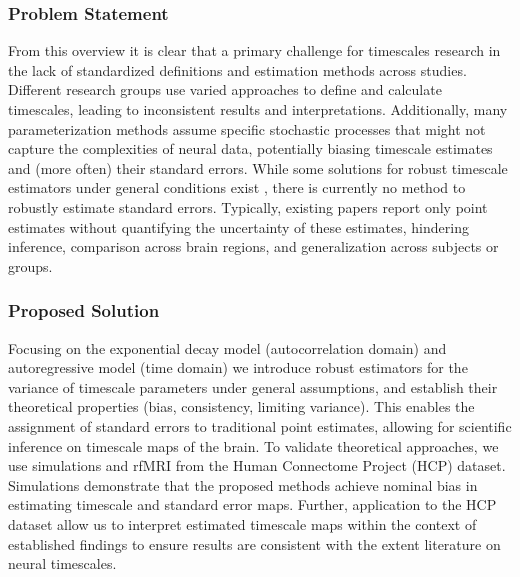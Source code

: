 \documentclass[latex/main.tex]{subfiles}
\begin{document}
\subsubsection*{Problem Statement}
From this overview it is clear that a primary challenge for timescales research in the lack of standardized definitions and estimation methods across studies. Different research groups use varied approaches to define and calculate timescales, leading to inconsistent results and interpretations. Additionally, many parameterization methods assume specific stochastic processes that might not capture the complexities of neural data, potentially biasing timescale estimates and (more often) their standard errors. While some solutions for robust timescale estimators under general conditions exist \cite{zeraati_flexible_2022, donoghue_parameterizing_2020, gao_neuronal_2020}, there is currently no method to robustly estimate standard errors. Typically, existing papers report only point estimates without quantifying the uncertainty of these estimates, hindering inference, comparison across brain regions, and generalization across subjects or groups.\\

\subsubsection*{Proposed Solution}
Focusing on the exponential decay model (autocorrelation domain) and autoregressive model (time domain) we introduce robust estimators for the variance of timescale parameters under general assumptions, and establish their theoretical properties (bias, consistency, limiting variance). This enables the assignment of standard errors to traditional point estimates, allowing for scientific inference on timescale maps of the brain. To validate theoretical approaches, we use simulations and rfMRI from the Human Connectome Project (HCP) dataset. Simulations demonstrate that the proposed methods achieve nominal bias in estimating timescale and standard error maps. Further, application to the HCP dataset allow us to interpret estimated timescale maps within the context of established findings to ensure results are consistent with the extent literature on neural timescales.\\
\end{document}
